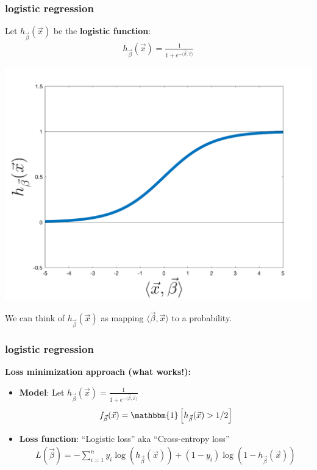 \documentclass[handout,compress]{beamer}
\begin{document}
\begin{frame}[t]
	\frametitle{logistic regression}
	Let $h_{\vec{\beta}}(\vec{x})$ be the \textbf{\alert{logistic function}}:
	\begin{align*}
	h_{\vec{\beta}}(\vec{x}) = \frac{1}{1 + e^{-\langle\vec{\beta},\vec{x}\rangle}}
	\end{align*}
	\begin{center}
		\includegraphics[width=.6\textwidth]{logistic_function.png}
		
		We can think of $h_{\vec{\beta}}(\vec{x})$ as mapping $\langle\vec{\beta},\vec{x}\rangle$ to a probability.
	\end{center}
\end{frame}

\begin{frame}
	\frametitle{logistic regression}
	\textbf{Loss minimization approach (what works!):}
	\begin{itemize}
		\item \textbf{Model}: Let $h_{\vec{\beta}}(\vec{x}) = \frac{1}{1 + e^{-\langle\vec{\beta},\vec{x}\rangle}}$
		\begin{align*}
		f_{\vec{\beta}}(\vec{x}) = \mathbbm{1}\left[h_{\vec{\beta}}(\vec{x})  > 1/2\right]
		\end{align*}
		\item \textbf{Loss function}: ``Logistic loss'' aka ``Cross-entropy loss''
		\begin{align*}
		L(\vec{\beta}) = - \sum_{i=1}^n y_i \log(h_{\vec{\beta}}(\vec{x})) + (1-y_i) \log(1 - h_{\vec{\beta}}(\vec{x})) 
		\end{align*}
	\end{itemize}
\vspace{1em}

\end{frame}
\end{document}
